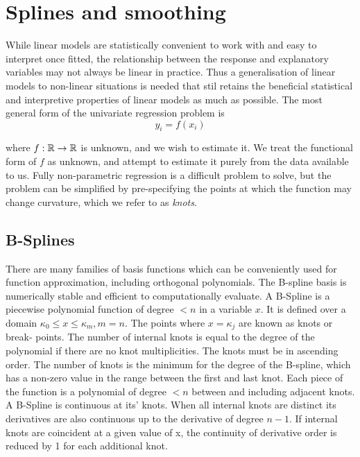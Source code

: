 \section{Splines and smoothing}
While linear models are statistically convenient to work with and easy to interpret once fitted, the
relationship between the response and explanatory variables may not always be linear in practice. Thus a
generalisation of linear models to non-linear situations is needed that stil retains the beneficial
statistical and interpretive properties of linear models as much as possible. The most general form of the
univariate regression problem is
$$
	y_i = f(x_i)
$$

\noindent where $f: {\mathbb{R}} \to {\mathbb{R}}$ is unknown, and we wish to estimate it. We treat the functional form of $f$ as
unknown, and attempt to estimate it purely from the data available to us. Fully non-parametric regression is a
difficult problem to solve, but the problem can be simplified by pre-specifying the points at which the
function may change curvature, which we refer to as \emph{knots}.

\subsection{B-Splines}

There are many families of basis functions which can be conveniently used for function approximation,
including orthogonal polynomials. The B-spline basis \citep{DeBoor1972} is numerically stable and efficient to
computationally evaluate. A B-Spline is a piecewise polynomial function of degree $< n$ in a variable $x$. It
is defined over a domain $\kappa_0 \leq x \leq \kappa_m, m=n$. The points where $x = \kappa_j$ are known as
knots or break- points. The number of internal knots is equal to the degree of the polynomial if there are no
knot multiplicities. The knots must be in ascending order. The number of knots is the minimum for the degree
of the B-spline, which has a non-zero value in the range between the first and last knot. Each piece of the
function is a polynomial of degree $< n$ between and including adjacent knots. A B-Spline is continuous
at its' knots. When all internal knots are distinct its derivatives are also continuous up to the
derivative of degree $n - 1$. If internal knots are coincident at a given value of x, the continuity of
derivative order is reduced by 1 for each additional knot.

